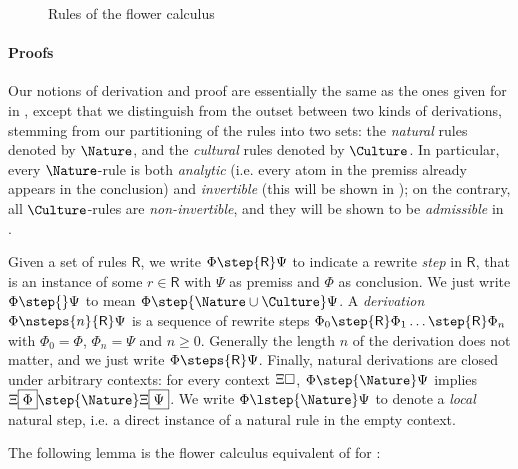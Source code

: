 \begin{figure*}[h!]
  
  \caption{Rules of the flower calculus}
\end{figure*}

\paragraph{Proofs}

Our notions of derivation and proof are essentially the same as the ones given
for  in , except that we distinguish from the outset between
two kinds of derivations, stemming from our partitioning of the rules into two
sets: the \emph{natural} rules denoted by $\Nature$, and the \emph{cultural}
rules denoted by $\Culture$. In particular, every $\Nature$-rule is both
\emph{analytic} (i.e. every atom in the premiss already appears in the
conclusion) and \emph{invertible} (this will be shown in ); on
the contrary, all $\Culture$-rules are \emph{non-invertible}, and they will be
shown to be \emph{admissible} in .

\begin{definition}[Derivation]
  Given a set of rules $\mathsf{R}$, we write $\Phi \step{\mathsf{R}} \Psi$ to
  indicate a rewrite \emph{step} in $\mathsf{R}$, that is an instance of some $r
  \in \mathsf{R}$ with $\Psi$ as premiss and $\Phi$ as conclusion. We just write
  $\Phi \step{} \Psi$ to mean $\Phi \step{\Nature\cup\Culture} \Psi$. A
  \emph{derivation} $\Phi \nsteps{n}{\mathsf{R}} \Psi$ is a sequence of rewrite
  steps $\Phi_0 \step{\mathsf{R}} \Phi_1 \ldots \step{\mathsf{R}} \Phi_n$ with
  $\Phi_0 = \Phi$, $\Phi_n = \Psi$ and $n \geq 0$. Generally the length $n$ of
  the derivation does not matter, and we just write $\Phi \steps{\mathsf{R}}
  \Psi$. Finally, natural derivations are closed under arbitrary contexts: for
  every context $\Xi\square$, $\Phi \step{\Nature} \Psi$ implies
  $\cfill{\Xi}{\Phi} \step{\Nature} \cfill{\Xi}{\Psi}$. We write $\Phi
  \lstep{\Nature} \Psi$ to denote a \emph{local} natural step, i.e. a direct
  instance of a natural rule in the empty context.
\end{definition}

The following lemma is the flower calculus equivalent of 
for :

